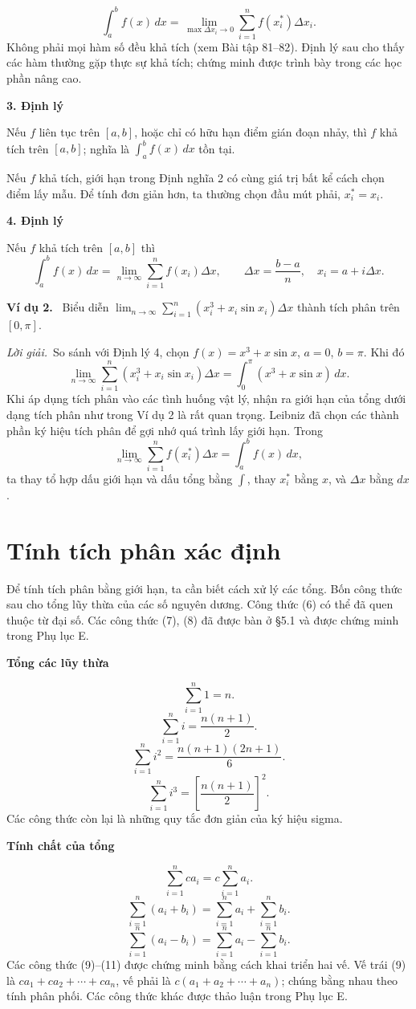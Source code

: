 \documentclass[12pt,a4paper]{article}
\newcommand{\ex}[1]{\par\medskip\noindent\textbf{Ví dụ #1.}\ }
\newcommand{\sol}{\par\nopagebreak[4]\noindent\textit{Lời giải.}\ }
\newcommand{\group}[1]{\par\medskip\noindent\textbf{#1}\par\nopagebreak[4]}
\begin{document}
\[\int_a^b f(x)\,dx=\lim_{\max\Delta x_i\to0}\sum_{i=1}^n f(x_i^*)\Delta x_i.\]
Không phải mọi hàm số đều khả tích (xem Bài tập 81–82). Định lý sau cho thấy các hàm thường gặp thực sự khả tích; chứng minh được trình bày trong các học phần nâng cao.
\group{3. Định lý} Nếu $f$ liên tục trên $[a,b]$, hoặc chỉ có hữu hạn điểm gián đoạn nhảy, thì $f$ khả tích trên $[a,b]$; nghĩa là $\int_a^b f(x)\,dx$ tồn tại.

Nếu $f$ khả tích, giới hạn trong Định nghĩa 2 có cùng giá trị bất kể cách chọn điểm lấy mẫu. Để tính đơn giản hơn, ta thường chọn đầu mút phải, $x_i^*=x_i$.
\group{4. Định lý} Nếu $f$ khả tích trên $[a,b]$ thì
\[\int_a^b f(x)\,dx=\lim_{n\to\infty}\sum_{i=1}^n f(x_i)\Delta x,\qquad\Delta x=\frac{b-a}n,\quad x_i=a+i\Delta x.\tag{4}\]
\ex{2} Biểu diễn $\displaystyle\lim_{n\to\infty}\sum_{i=1}^n(x_i^3+x_i\sin x_i)\Delta x$ thành tích phân trên $[0,\pi]$.
\sol So sánh với Định lý 4, chọn $f(x)=x^3+x\sin x$, $a=0$, $b=\pi$. Khi đó
\[\lim_{n\to\infty}\sum_{i=1}^n(x_i^3+x_i\sin x_i)\Delta x=\int_0^\pi(x^3+x\sin x)\,dx.\]
Khi áp dụng tích phân vào các tình huống vật lý, nhận ra giới hạn của tổng dưới dạng tích phân như trong Ví dụ 2 là rất quan trọng. Leibniz đã chọn các thành phần ký hiệu tích phân để gợi nhớ quá trình lấy giới hạn. Trong
\[\lim_{n\to\infty}\sum_{i=1}^n f(x_i^*)\Delta x=\int_a^b f(x)\,dx,\]
ta thay tổ hợp dấu giới hạn và dấu tổng bằng $\int$, thay $x_i^*$ bằng $x$, và $\Delta x$ bằng $dx$.
\section*{Tính tích phân xác định}
Để tính tích phân bằng giới hạn, ta cần biết cách xử lý các tổng. Bốn công thức sau cho tổng lũy thừa của các số nguyên dương. Công thức (6) có thể đã quen thuộc từ đại số. Các công thức (7), (8) đã được bàn ở §5.1 và được chứng minh trong Phụ lục E.
\group{Tổng các lũy thừa}
\[\sum_{i=1}^n1=n.\tag{5}\]
\[\sum_{i=1}^ni=\frac{n(n+1)}2.\tag{6}\]
\[\sum_{i=1}^ni^2=\frac{n(n+1)(2n+1)}6.\tag{7}\]
\[\sum_{i=1}^ni^3=\left[\frac{n(n+1)}2\right]^2.\tag{8}\]
Các công thức còn lại là những quy tắc đơn giản của ký hiệu sigma.
\group{Tính chất của tổng}
\[\sum_{i=1}^n ca_i=c\sum_{i=1}^n a_i.\tag{9}\]
\[\sum_{i=1}^n(a_i+b_i)=\sum_{i=1}^n a_i+\sum_{i=1}^n b_i.\tag{10}\]
\[\sum_{i=1}^n(a_i-b_i)=\sum_{i=1}^n a_i-\sum_{i=1}^n b_i.\tag{11}\]
Các công thức (9)–(11) được chứng minh bằng cách khai triển hai vế. Vế trái (9) là $ca_1+ca_2+\cdots+ca_n$, vế phải là $c(a_1+a_2+\cdots+a_n)$; chúng bằng nhau theo tính phân phối. Các công thức khác được thảo luận trong Phụ lục E.
\end{document}
